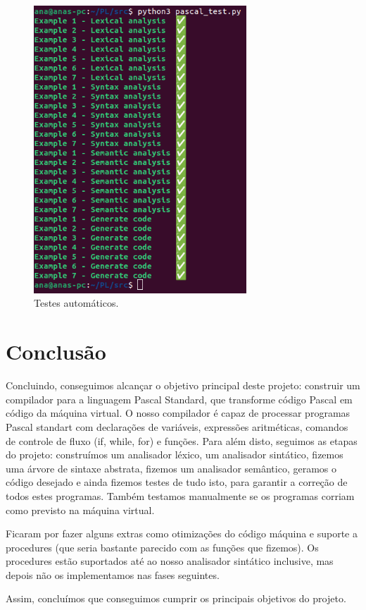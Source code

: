 \documentclass[12pt,a4paper]{report}
\begin{document}
\begin{figure}[H]
    \centering
    \includegraphics[width=8cm]{images/tests.png}
    \caption{Testes automáticos.}    
\end{figure}

\chapter{Conclusão}

Concluindo, conseguimos alcançar o objetivo principal deste projeto: construir um compilador para a linguagem Pascal Standard, que transforme código Pascal em código da máquina virtual.
O nosso compilador é capaz de processar programas Pascal standart com declarações de variáveis, expressões aritméticas, comandos de controle de fluxo (if, while, for) e funções. Para além disto,
seguimos as etapas do projeto: construímos um analisador léxico, um analisador sintático, fizemos uma árvore de sintaxe abstrata, fizemos um analisador semântico, geramos o código desejado
e ainda fizemos testes de tudo isto, para garantir a correção de todos estes programas. Também testamos manualmente se os programas corriam como previsto na máquina virtual.

\vspace{1em}

Ficaram por fazer alguns extras como otimizações do código máquina e suporte a procedures (que seria bastante parecido
com as funções que fizemos).
Os procedures estão suportados até ao nosso analisador sintático inclusive, mas depois não os implementamos nas fases seguintes.

\vspace{1em}

Assim, concluímos que conseguimos cumprir os principais objetivos do projeto. 
\end{document}
